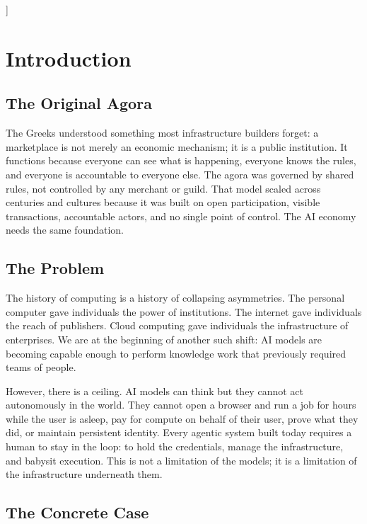 \documentclass[10pt,twocolumn]{article}
\begin{document}
{  \vspace{12pt}
}]

\section{Introduction}
\label{sec:intro}

\subsection{The Original Agora}

The Greeks understood something most infrastructure builders forget: a marketplace is not
merely an economic mechanism; it is a public institution. It functions because everyone
can see what is happening, everyone knows the rules, and everyone is accountable to
everyone else. The agora was governed by shared rules, not controlled by any merchant or
guild. That model scaled across centuries and cultures because it was built on open
participation, visible transactions, accountable actors, and no single point of control. The
AI economy needs the same foundation.

\subsection{The Problem}

The history of computing is a history of collapsing asymmetries. The personal computer gave
individuals the power of institutions. The internet gave individuals the reach of publishers.
Cloud computing gave individuals the infrastructure of enterprises. We are at the beginning
of another such shift: AI models are becoming capable enough to perform knowledge work
that previously required teams of people.

However, there is a ceiling. AI models can think but they cannot act autonomously in the
world. They cannot open a browser and run a job for hours while the user is asleep, pay for
compute on behalf of their user, prove what they did, or maintain persistent identity. Every
agentic system built today requires a human to stay in the loop: to hold the credentials,
manage the infrastructure, and babysit execution. This is not a limitation of the models; it
is a limitation of the infrastructure underneath them.

\subsection{The Concrete Case}
\end{document}
